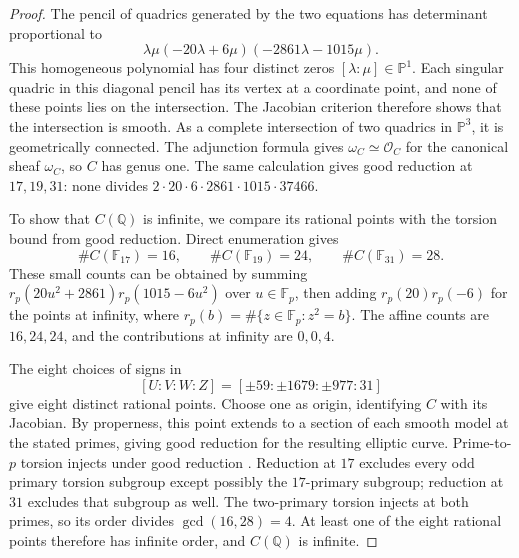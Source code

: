 \documentclass[11pt,leqno,oneside,letterpaper]{amsart}
\theoremstyle{remark}
\numberwithin{equation}{section}
\newcommand{\Q}{\mathbb Q}
\newcommand{\F}{\mathbb F}
\begin{document}
\begin{proof}
  The pencil of quadrics generated by the two equations has determinant proportional to
  \[
    \lambda\mu(-20\lambda+6\mu)(-2861\lambda-1015\mu).
  \]
  This homogeneous polynomial has four distinct zeros $[\lambda:\mu]\in\mathbb P^1$. Each singular quadric in this diagonal pencil has its vertex at a coordinate point, and none of these points lies on the intersection. The Jacobian criterion therefore shows that the intersection is smooth. As a complete intersection of two quadrics in $\mathbb P^3$, it is geometrically connected. The adjunction formula gives $\omega_C\simeq\mathcal O_C$ for the canonical sheaf $\omega_C$, so $C$ has genus one. The same calculation gives good reduction at $17,19,31$: none divides $2\cdot20\cdot6\cdot2861\cdot1015\cdot37466$.

  To show that $C(\Q)$ is infinite, we compare its rational points with the torsion bound from good reduction. Direct enumeration gives
  \[
    \#C(\F_{17})=16,\qquad \#C(\F_{19})=24,\qquad \#C(\F_{31})=28.
  \]
  These small counts can be obtained by summing $r_p(20u^2+2861)r_p(1015-6u^2)$ over $u\in\F_p$, then adding $r_p(20)r_p(-6)$ for the points at infinity, where $r_p(b)=\#\{z\in\F_p:z^2=b\}$. The affine counts are $16,24,24$, and the contributions at infinity are $0,0,4$.

  The eight choices of signs in
  \[
    [U:V:W:Z]=[\pm59:\pm1679:\pm977:31]
  \]
  give eight distinct rational points. Choose one as origin, identifying $C$ with its Jacobian. By properness, this point extends to a section of each smooth model at the stated primes, giving good reduction for the resulting elliptic curve. Prime-to-$p$ torsion injects under good reduction \cite[Proposition VII.3.1(b)]{Silverman2009}. Reduction at $17$ excludes every odd primary torsion subgroup except possibly the $17$-primary subgroup; reduction at $31$ excludes that subgroup as well. The two-primary torsion injects at both primes, so its order divides $\gcd(16,28)=4$. At least one of the eight rational points therefore has infinite order, and $C(\Q)$ is infinite.


\end{proof}
\end{document}
